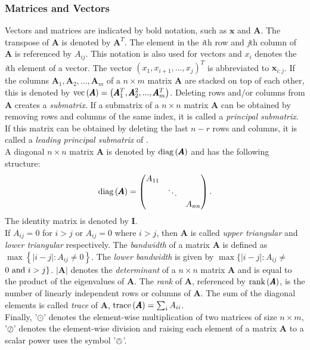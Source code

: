 \subsubsection*{Matrices and Vectors}
Vectors and matrices are indicated by bold notation, such as $\pmb{x}$ and $\pmb{A}$. The transpose of $\pmb{A}$ is denoted by $\pmb{A}^T$. The element in the \textit{i}th row and \textit{j}th column of $\pmb{A}$ is referenced by $A_{ij}$. This notation is also used for vectors and $x_i$ denotes the \textit{i}th element of a vector. The vector $\left(x_1,x_{i+1},...,x_j\right)^T$ is abbreviated to $\pmb{x}_{i:j}$. If the columns $\pmb{A}_1, \pmb{A}_2,...,\pmb{A}_m$ of a $n\times m$ matrix $\pmb{A}$ are stacked on top of each other, this is denoted by $\hbox{vec}\left(\pmb{A}\right)=\left(\pmb{A}_1^T,\pmb{A}_2^2,...,\pmb{A}_m^T\right)$. Deleting rows and/or columns from $\pmb{A}$ creates a \textit{submatrix}. If a submatrix of a $n\times n$ matrix $\pmb{A}$ can be obtained by removing rows and columns of the same index, it is called a \textit{principal submatrix}. If this matrix can be obtained by deleting the last $n-r$ rows and columns, it is called a \textit{leading principal submatrix} of . \\
A diagonal $n\times n$ matrix $\pmb{A}$ is denoted by $\hbox{diag}\left(\pmb{A}\right)$ and has the following structure:
\begin{equation*}
    \hbox{diag}\left(\pmb{A}\right)=\begin{pmatrix}
    A_{11} \\
    & \ddots \\
    &&A_{nn}
    \end{pmatrix}.
\end{equation*}
The identity matrix is denoted by $\pmb{I}$. \\
If $A_{ij}=0$ for $i>j$ or $A_{ij} = 0$ where $i>j$, then $\pmb{A}$ is called \textit{upper triangular} and \textit{lower triangular} respectively. The \textit{bandwidth} of a matrix $\pmb{A}$ is defined as $\max\left\lbrace|i-j|:A_{ij}\neq0\right\rbrace$. The \textit{lower bandwidth} is given by $\max\lbrace|i-j|:A_{ij}\neq $ $0\hbox{ and } i > j\rbrace$. $|\pmb{A}|$ denotes the \textit{determinant} of a $n\times n$ matrix $\pmb{A}$ and is equal to the product of the eigenvalues of $\pmb{A}$. The \textit{rank} of $\pmb{A}$, referenced by $\hbox{rank}\left(\pmb{A}\right)$, is the number of linearly independent rows or columns of $\pmb{A}$. The sum of the diagonal elements is called \textit{trace} of $\pmb{A}$, $\hbox{trace}\left(\pmb{A}\right)=\sum_{i}A_{ii}$.\\
Finally, '$\odot$' denotes the element-wise multiplication of two matrices of size $n\times m$, '$\oslash$' denotes the element-wise division and raising each element of a matrix $\pmb{A}$ to a scalar power uses the symbol '$\owedge$'.
